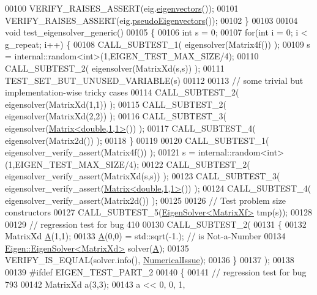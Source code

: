 \begin{DoxyCode}
00100   VERIFY\_RAISES\_ASSERT(eig.\hyperlink{group___eigenvalues___module_a66288022802172e3ee059283b26201d7}{eigenvectors}());
00101   VERIFY\_RAISES\_ASSERT(eig.\hyperlink{group___eigenvalues___module_a4e796226f06e1f7347cf03a38755a155}{pseudoEigenvectors}());
00102 \}
00103 
00104 \textcolor{keywordtype}{void} test\_eigensolver\_generic()
00105 \{
00106   \textcolor{keywordtype}{int} s = 0;
00107   \textcolor{keywordflow}{for}(\textcolor{keywordtype}{int} i = 0; i < g\_repeat; i++) \{
00108     CALL\_SUBTEST\_1( eigensolver(Matrix4f()) );
00109     s = internal::random<int>(1,EIGEN\_TEST\_MAX\_SIZE/4);
00110     CALL\_SUBTEST\_2( eigensolver(MatrixXd(s,s)) );
00111     TEST\_SET\_BUT\_UNUSED\_VARIABLE(s)
00112 
00113     \textcolor{comment}{// some trivial but implementation-wise tricky cases}
00114     CALL\_SUBTEST\_2( eigensolver(MatrixXd(1,1)) );
00115     CALL\_SUBTEST\_2( eigensolver(MatrixXd(2,2)) );
00116     CALL\_SUBTEST\_3( eigensolver(\hyperlink{group___core___module_class_eigen_1_1_matrix}{Matrix<double,1,1>}()) );
00117     CALL\_SUBTEST\_4( eigensolver(Matrix2d()) );
00118   \}
00119 
00120   CALL\_SUBTEST\_1( eigensolver\_verify\_assert(Matrix4f()) );
00121   s = internal::random<int>(1,EIGEN\_TEST\_MAX\_SIZE/4);
00122   CALL\_SUBTEST\_2( eigensolver\_verify\_assert(MatrixXd(s,s)) );
00123   CALL\_SUBTEST\_3( eigensolver\_verify\_assert(\hyperlink{group___core___module_class_eigen_1_1_matrix}{Matrix<double,1,1>}()) );
00124   CALL\_SUBTEST\_4( eigensolver\_verify\_assert(Matrix2d()) );
00125 
00126   \textcolor{comment}{// Test problem size constructors}
00127   CALL\_SUBTEST\_5(\hyperlink{group___eigenvalues___module_class_eigen_1_1_eigen_solver}{EigenSolver<MatrixXf>} tmp(s));
00128 
00129   \textcolor{comment}{// regression test for bug 410}
00130   CALL\_SUBTEST\_2(
00131   \{
00132      MatrixXd \hyperlink{group___core___module_class_eigen_1_1_matrix}{A}(1,1);
00133      \hyperlink{group___core___module_class_eigen_1_1_matrix}{A}(0,0) = std::sqrt(-1.); \textcolor{comment}{// is Not-a-Number}
00134      \hyperlink{group___eigenvalues___module_class_eigen_1_1_eigen_solver}{Eigen::EigenSolver<MatrixXd>} solver(\hyperlink{group___core___module_class_eigen_1_1_matrix}{A});
00135      VERIFY\_IS\_EQUAL(solver.info(), \hyperlink{group__enums_gga85fad7b87587764e5cf6b513a9e0ee5eaaf9b736d310a664e7729d163a035cc5f}{NumericalIssue});
00136   \}
00137   );
00138   
00139 \textcolor{preprocessor}{#ifdef EIGEN\_TEST\_PART\_2}
00140   \{
00141     \textcolor{comment}{// regression test for bug 793}
00142     MatrixXd a(3,3);
00143     a << 0,  0,  1,

\end{DoxyCode}
